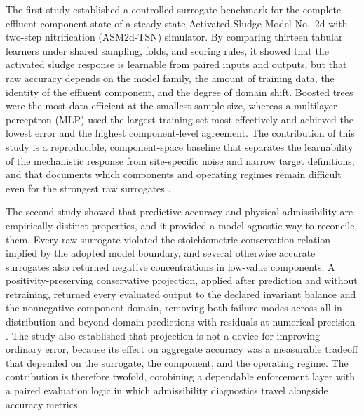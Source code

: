 \documentclass[12pt, twoside]{book}
\begin{document}
The first study established a controlled surrogate benchmark for the complete effluent component state of a
steady-state Activated Sludge Model No.\ 2d with two-step nitrification (ASM2d-TSN) simulator. By comparing
thirteen tabular learners under shared sampling, folds, and scoring rules, it showed that the activated sludge
response is learnable from paired inputs and outputs, but that raw accuracy depends on the model family, the
amount of training data, the identity of the effluent component, and the degree of domain shift. Boosted trees
were the most data efficient at the smallest sample size, whereas a multilayer perceptron (MLP) used the
largest training set most effectively and achieved the lowest error and the highest component-level agreement.
The contribution of this study is a reproducible, component-space baseline that separates the learnability of
the mechanistic response from site-specific noise and narrow target definitions, and that documents which
components and operating regimes remain difficult even for the strongest raw surrogates \citep{VieringLoog2023}.

The second study showed that predictive accuracy and physical admissibility are empirically distinct
properties, and it provided a model-agnostic way to reconcile them. Every raw surrogate violated the
stoichiometric conservation relation implied by the adopted model boundary, and several otherwise accurate
surrogates also returned negative concentrations in low-value components. A positivity-preserving conservative
projection, applied after prediction and without retraining, returned every evaluated output to the declared
invariant balance and the nonnegative component domain, removing both failure modes across all in-distribution
and beyond-domain predictions with residuals at numerical precision \citep{KircherVotsmeier2025}. The study
also established that projection is not a device for improving ordinary error, because its effect on aggregate
accuracy was a measurable tradeoff that depended on the surrogate, the component, and the operating regime. The
contribution is therefore twofold, combining a dependable enforcement layer with a paired evaluation logic in
which admissibility diagnostics travel alongside accuracy metrics.
\end{document}

